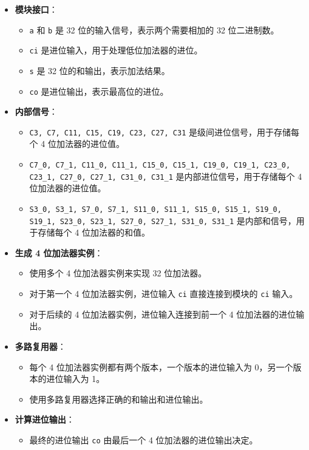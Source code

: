 \documentclass[12pt,hyperref,a4paper,UTF8]{ctexart}
\begin{document}
\begin{itemize}
    \item \textbf{模块接口}：
    \begin{itemize}
        \item \texttt{a} 和 \texttt{b} 是 32 位的输入信号，表示两个需要相加的 32 位二进制数。
        \item \texttt{ci} 是进位输入，用于处理低位加法器的进位。
        \item \texttt{s} 是 32 位的和输出，表示加法结果。
        \item \texttt{co} 是进位输出，表示最高位的进位。
    \end{itemize}
    \item \textbf{内部信号}：
    \begin{itemize}
        \item \texttt{C3, C7, C11, C15, C19, C23, C27, C31} 是级间进位信号，用于存储每个 4 位加法器的进位值。
        \item \texttt{C7\_0, C7\_1, C11\_0, C11\_1, C15\_0, C15\_1, C19\_0, C19\_1, C23\_0, C23\_1, C27\_0, C27\_1, C31\_0, C31\_1} 是内部进位信号，用于存储每个 4 位加法器的进位值。
        \item \texttt{S3\_0, S3\_1, S7\_0, S7\_1, S11\_0, S11\_1, S15\_0, S15\_1, S19\_0, S19\_1, S23\_0, S23\_1, S27\_0, S27\_1, S31\_0, S31\_1} 是内部和信号，用于存储每个 4 位加法器的和值。
    \end{itemize}
    \item \textbf{生成 4 位加法器实例}：
    \begin{itemize}
        \item 使用多个 4 位加法器实例来实现 32 位加法器。
        \item 对于第一个 4 位加法器实例，进位输入 \texttt{ci} 直接连接到模块的 \texttt{ci} 输入。
        \item 对于后续的 4 位加法器实例，进位输入连接到前一个 4 位加法器的进位输出。
    \end{itemize}
    \item \textbf{多路复用器}：
    \begin{itemize}
        \item 每个 4 位加法器实例都有两个版本，一个版本的进位输入为 0，另一个版本的进位输入为 1。
        \item 使用多路复用器选择正确的和输出和进位输出。
    \end{itemize}
    \item \textbf{计算进位输出}：
    \begin{itemize}
        \item 最终的进位输出 \texttt{co} 由最后一个 4 位加法器的进位输出决定。
    \end{itemize}
\end{itemize}
\end{document}
